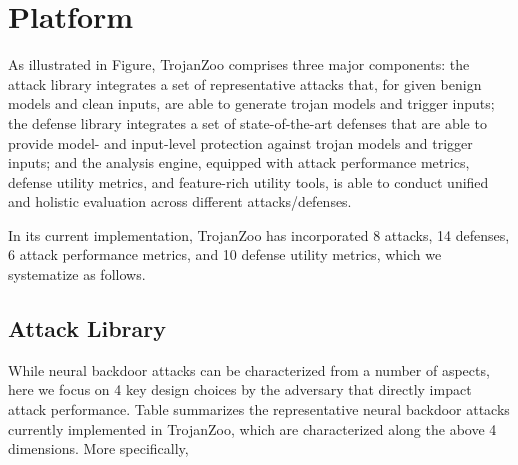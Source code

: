 \documentclass[compsoc,conference,a4paper,10pt,times]{IEEEtran}
\newcommand{\system}{{\sc \small TrojanZoo}\xspace}
\begin{document}
\section{Platform}
\label{sec:platform}


As illustrated in Figure, \system comprises three major components:  the attack library integrates a set of representative attacks that, for given benign models and clean inputs, are able to generate trojan models and trigger inputs;  the defense library integrates a set of state-of-the-art defenses that are able to provide model- and input-level protection against trojan models and trigger inputs;  
and  the analysis engine, equipped with attack performance metrics, defense utility metrics, and feature-rich utility tools, is able to conduct unified and holistic evaluation across different attacks/defenses.



In its current implementation, \system has incorporated 8 attacks, 14 defenses, 6 attack performance metrics, and 10 defense utility metrics, which we systematize as follows.

\subsection{Attack Library}

While neural backdoor attacks can be characterized from a number of aspects, here we focus on 4 key design choices by the adversary that directly impact attack performance. Table summarizes the representative neural backdoor attacks currently implemented in \system, which are characterized along the above 4 dimensions. More specifically,
\end{document}

